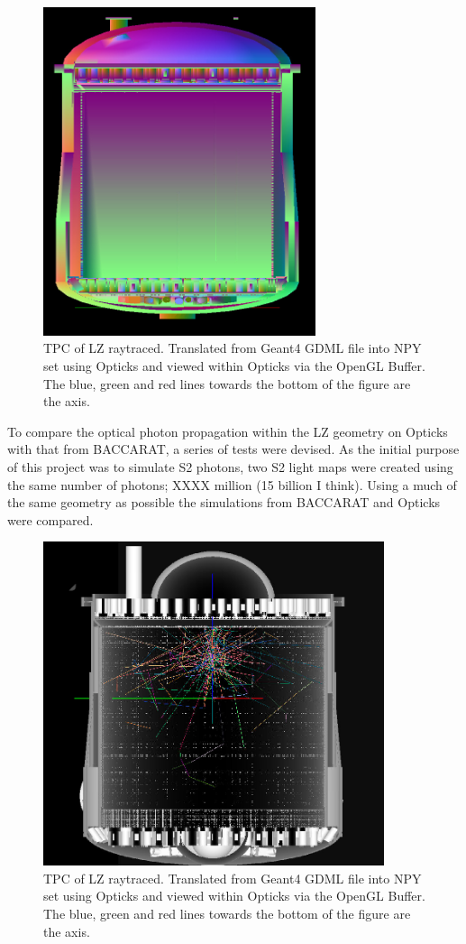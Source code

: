 \begin{figure}[!htbp]
\includegraphics[width=8cm]{Figures/Simulations/LZ_In_Opticks.png}
\centering
\caption{TPC of LZ raytraced. Translated from Geant4 GDML file into NPY set using Opticks and viewed within Opticks via the OpenGL Buffer.
The blue, green and red lines towards the bottom of the figure are the axis.}
\label{fig:OpticksLZTPC}
\end{figure}

\par
To compare the optical photon propagation within the LZ geometry on Opticks with that from BACCARAT, a series of tests were devised.
As the initial purpose of this project was to simulate S2 photons, two S2 light maps were created using the same number of photons; XXXX million (15 billion I think).
Using a much of the same geometry as possible the simulations from BACCARAT and Opticks were compared.

\begin{figure}[!htbp]
\includegraphics[width=10cm]{Figures/Simulations/LZ_S1_photons_In_Opticks.png}
\centering
\caption{TPC of LZ raytraced. Translated from Geant4 GDML file into NPY set using Opticks and viewed within Opticks via the OpenGL Buffer.
The blue, green and red lines towards the bottom of the figure are the axis.}
\label{fig:OpticksLZTPC_S1_Photons}
\end{figure}

